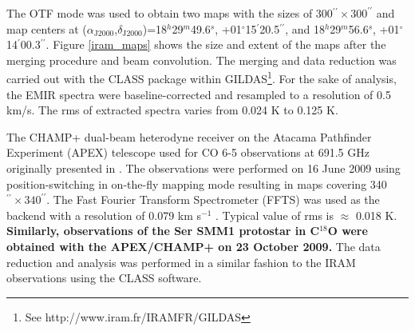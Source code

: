 \documentclass{aa}
\begin{document}
The OTF mode was used to obtain two maps with the sizes of 300$^{\prime\prime}\times300^{\prime\prime}$ 
and map centers at ($\alpha_\mathrm{J2000}$,$\delta_\mathrm{J2000}$)=18$^h$29$^m$49.6$^s$,
+01$^{\circ}$15$^{\prime}$20.5$^{\prime\prime}$, and 18$^h$29$^m$56.6$^s$, +01$^{\circ}$14$^{\prime}$00.3$^{\prime\prime}$. 
Figure \ref{iram_maps} shows the size and extent of the maps after the merging procedure 
and beam convolution. The merging and data reduction was carried out with the CLASS package within GILDAS\footnote{See
http://www.iram.fr/IRAMFR/GILDAS}. For the sake of analysis, the EMIR spectra were
baseline-corrected and resampled to a resolution of 0.5 km/s. The rms of extracted spectra varies from 0.024 K to 0.125 K. 

The CHAMP+ dual-beam heterodyne receiver on the Atacama Pathfinder Experiment (APEX) telescope used for CO 6-5 observations at 691.5 GHz originally presented in \citealt{Yil15}. The observations were performed on 16 June 2009 using position-switching in on-the-fly mapping mode resulting in maps covering 340$^{\prime\prime}\times 340^{\prime\prime}$. The Fast Fourier Transform Spectrometer (FFTS) was used as the backend with a resolution of 0.079 km s$^{-1}$ \citep{Kle06}. Typical value of rms is $\approx$ 0.018 K. 
\textbf{Similarly, observations of the Ser SMM1 protostar in C$^{18}$O were obtained with the APEX/CHAMP+ on 23 October 2009.} The data reduction and analysis was performed in a similar fashion to the IRAM observations using the CLASS software.
\end{document}
